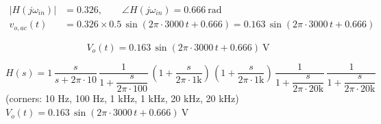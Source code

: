 \documentclass[11pt]{article}
\begin{document}
\begin{align*}
|H(j\omega_{in})| &= 0.326, \qquad \angle H(j\omega_{in}) = 0.666\ \mathrm{rad} \\
v_{o,ac}(t) &= 0.326\times 0.5\,\sin\left(2\pi\cdot 3000\,t + 0.666\right) = 0.163\,\sin\left(2\pi\cdot 3000\,t + 0.666\right)
\end{align*}

\[
\boxed{V_o(t) = 0.163\,\sin\left(2\pi\cdot 3000\,t + 0.666\right)\ \mathrm{V}}
\]

\begin{ansbox}
$H(s) = 1\,\dfrac{s}{s+2\pi\cdot 10}\,\dfrac{1}{1+\dfrac{s}{2\pi\cdot 100}}\,\left(1+\dfrac{s}{2\pi\cdot 1\mathrm{k}}\right)\,\left(1+\dfrac{s}{2\pi\cdot 1\mathrm{k}}\right)\,\dfrac{1}{1+\dfrac{s}{2\pi\cdot 20\mathrm{k}}}\,\dfrac{1}{1+\dfrac{s}{2\pi\cdot 20\mathrm{k}}}$\quad (corners: 10 Hz, 100 Hz, 1 kHz, 1 kHz, 20 kHz, 20 kHz)\\[4pt]
$V_o(t) = 0.163\,\sin\left(2\pi\cdot 3000\,t + 0.666\right)\ \mathrm{V}$
\end{ansbox}
\end{document}
